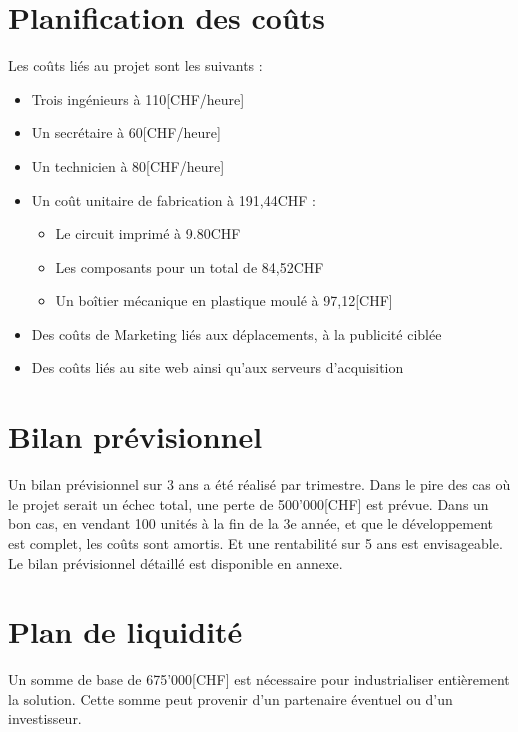 \section{Planification des coûts}
Les coûts liés au projet sont les suivants :
\begin{itemize}
    \item Trois ingénieurs à 110[CHF/heure]
    \item Un secrétaire à 60[CHF/heure]
    \item Un technicien à 80[CHF/heure]
    \item Un coût unitaire de fabrication à 191,44CHF :
    \begin{itemize}
        \item Le circuit imprimé à 9.80CHF
        \item Les composants pour un total de 84,52CHF
        \item Un boîtier mécanique en plastique moulé à 97,12[CHF]
    \end{itemize}
    \item Des coûts de Marketing liés aux déplacements, à la publicité ciblée
    \item Des coûts liés au site web ainsi qu'aux serveurs d'acquisition
\end{itemize}

\section{Bilan prévisionnel}
Un bilan prévisionnel sur 3 ans a été réalisé par trimestre.
Dans le pire des cas où le projet serait un échec total,
une perte de 500'000[CHF] est prévue.
Dans un bon cas, en vendant 100 unités à la fin de la 3e année,
et que le développement est complet, les coûts sont amortis. Et une
rentabilité sur 5 ans est envisageable.
Le bilan prévisionnel détaillé est disponible en annexe.

\section{Plan de liquidité}
Un somme de base de 675'000[CHF] est nécessaire pour industrialiser
entièrement la solution. Cette somme peut provenir d'un partenaire
éventuel ou d'un investisseur.